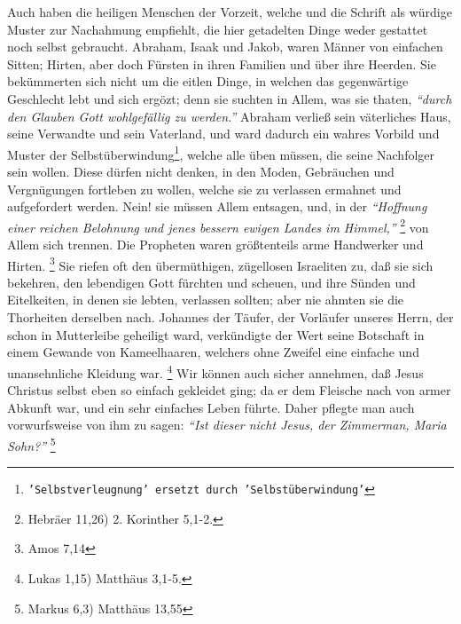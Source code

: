 Auch haben die heiligen Menschen der Vorzeit, welche und die Schrift als würdige
Muster zur Nachahmung empfiehlt, die hier getadelten Dinge weder gestattet noch
selbst gebraucht. Abraham, Isaak und Jakob, waren Männer von einfachen Sitten;
Hirten, aber doch Fürsten in ihren Familien und über ihre Heerden. Sie
bekümmerten sich nicht um die eitlen Dinge, in welchen das gegenwärtige
Geschlecht lebt und sich ergözt; denn sie suchten in Allem, was sie thaten,
\textit{"`durch den Glauben Gott wohlgefällig zu werden."'} Abraham verließ sein
väterliches Haus, seine Verwandte und sein Vaterland, und ward dadurch ein
wahres Vorbild und Muster der Selbstüberwindung\footnote{\texttt{'Selbstverleugnung' ersetzt durch 'Selbstüberwindung'}}, welche alle üben müssen, die
seine Nachfolger sein wollen. Diese dürfen nicht denken, in den Moden,
Gebräuchen und Vergnügungen fortleben zu wollen, welche sie zu verlassen
ermahnet und aufgefordert werden. Nein! sie müssen Allem entsagen, und, in der
\textit{"`Hoffnung einer reichen Belohnung und jenes bessern ewigen Landes im
Himmel,"'}
\footnote{Hebräer 11,26) 2. Korinther 5,1-2.} 
von Allem sich trennen. Die
Propheten waren größtenteils arme Handwerker und Hirten.
\footnote{Amos 7,14} 
Sie riefen oft den übermüthigen, zügellosen Israeliten zu, daß sie sich bekehren,
den lebendigen Gott fürchten und scheuen, und ihre Sünden und Eitelkeiten, in
denen sie lebten, verlassen sollten; aber nie ahmten sie die Thorheiten
derselben nach. Johannes der Täufer, der Vorläufer unseres Herrn, der schon in
Mutterleibe geheiligt ward, verkündigte der Wert seine Botschaft in einem
Gewande von Kameelhaaren, welchers ohne Zweifel eine einfache und unansehnliche
Kleidung war.
\footnote{Lukas 1,15) Matthäus 3,1-5.} 
Wir können auch sicher annehmen,
daß Jesus Christus selbst eben so einfach gekleidet ging; da er dem Fleische
nach von armer Abkunft war, und ein sehr einfaches Leben führte. Daher pflegte
man auch vorwurfsweise von ihm zu sagen: 
\textit{"`Ist dieser nicht Jesus, der
Zimmerman, Maria Sohn?"'}
\footnote{Markus 6,3) Matthäus 13,55} 
